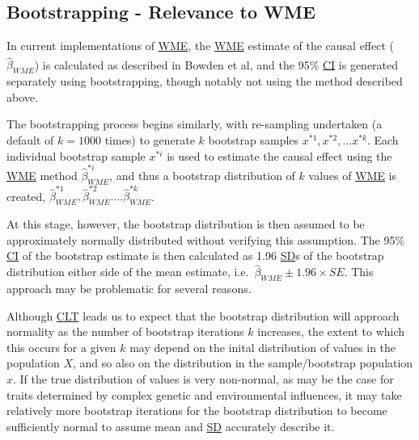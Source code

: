 \documentclass[
]{article}
\begin{document}
\newpage

\subsection{Bootstrapping - Relevance to WME}\label{bootstrapping---relevance-to-wme}

In current implementations of \hyperref[acronyms_WME]{WME}, the \hyperref[acronyms_WME]{WME} estimate of the causal effect (\(\hat{\beta}_{WME}\)) is calculated as described in Bowden et al\textsuperscript{}, and the 95\% \hyperref[acronyms_CI]{CI} is generated separately using bootstrapping, though notably not using the method described above.

The bootstrapping process begins similarly, with re-sampling undertaken (a default of \(k = 1000\) times) to generate \(k\) bootstrap samples \(x^{*1}, x^{*2},...x^{*k}\). Each individual bootstrap sample \(x^{*i}\) is used to estimate the causal effect using the \hyperref[acronyms_WME]{WME} method \(\hat{\beta}^{*i}_{WME}\), and thus a bootstrap distribution of \(k\) values of \hyperref[acronyms_WME]{WME} is created, \(\hat{\beta}^{*1}_{WME},  \hat{\beta}^{*2}_{WME}....\hat{\beta}^{*k}_{WME}\).

At this stage, however, the bootstrap distribution is then assumed to be approximately normally distributed without verifying this assumption. The 95\% \hyperref[acronyms_CI]{CI} of the bootstrap estimate is then calculated as 1.96 \hyperref[acronyms_SD]{SD}s of the bootstrap distribution either side of the mean estimate, i.e.~\(\hat{\beta}_{WME} \pm 1.96  \times SE\). This approach may be problematic for several reasons.

Although \hyperref[acronyms_CLT]{CLT} leads us to expect that the bootstrap distribution will approach normality as the number of bootstrap iterations \(k\) increases, the extent to which this occurs for a given \(k\) may depend on the inital distribution of values in the population \(X\), and so also on the distribution in the sample/bootstrap population \(x\). If the true distribution of values is very non-normal, as may be the case for traits determined by complex genetic and environmental influences, it may take relatively more bootstrap iterations for the bootstrap distribution to become sufficiently normal to assume mean and \hyperref[acronyms_SD]{SD} accurately describe it.
\end{document}
